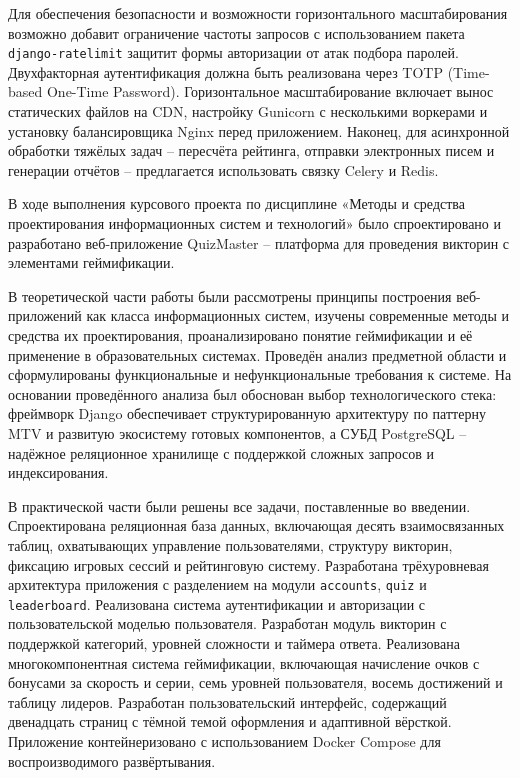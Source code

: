 \documentclass[14pt,a4paper]{extreport}
\begin{document}
Для обеспечения безопасности и возможности горизонтального масштабирования возможно добавит ограничение частоты запросов с использованием пакета \texttt{django-ratelimit} защитит формы авторизации от атак подбора паролей. Двухфакторная аутентификация должна быть реализована через TOTP (Time-based One-Time Password). Горизонтальное масштабирование включает вынос статических файлов на CDN, настройку Gunicorn с несколькими воркерами и установку балансировщика Nginx перед приложением. Наконец, для асинхронной обработки тяжёлых задач -- пересчёта рейтинга, отправки электронных писем и генерации отчётов -- предлагается использовать связку Celery и Redis.

\newpage
\conclusion

В ходе выполнения курсового проекта по дисциплине «Методы и средства проектирования информационных систем и технологий» было спроектировано и разработано веб-приложение QuizMaster -- платформа для проведения викторин с элементами геймификации.

В теоретической части работы были рассмотрены принципы построения веб-приложений как класса информационных систем, изучены современные методы и средства их проектирования, проанализировано понятие геймификации и её применение в образовательных системах. Проведён анализ предметной области и сформулированы функциональные и нефункциональные требования к системе. На основании проведённого анализа был обоснован выбор технологического стека: фреймворк Django обеспечивает структурированную архитектуру по паттерну MTV и развитую экосистему готовых компонентов, а СУБД PostgreSQL -- надёжное реляционное хранилище с поддержкой сложных запросов и индексирования.

В практической части были решены все задачи, поставленные во введении. Спроектирована реляционная база данных, включающая десять взаимосвязанных таблиц, охватывающих управление пользователями, структуру викторин, фиксацию игровых сессий и рейтинговую систему. Разработана трёхуровневая архитектура приложения с разделением на модули \texttt{accounts}, \texttt{quiz} и \texttt{leaderboard}. Реализована система аутентификации и авторизации с пользовательской моделью пользователя. Разработан модуль викторин с поддержкой категорий, уровней сложности и таймера ответа. Реализована многокомпонентная система геймификации, включающая начисление очков с бонусами за скорость и серии, семь уровней пользователя, восемь достижений и таблицу лидеров. Разработан пользовательский интерфейс, содержащий двенадцать страниц с тёмной темой оформления и адаптивной вёрсткой. Приложение контейнеризовано с использованием Docker Compose для воспроизводимого развёртывания.
\end{document}
